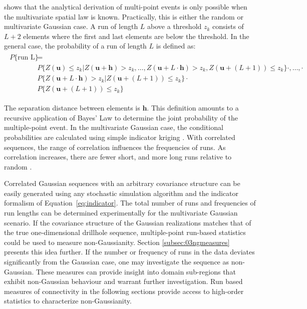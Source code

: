 \cite{ortiz2003characterization} shows that the analytical derivation of multi-point events is only possible when the multivariate spatial law is known. Practically, this is either the random or multivariate Gaussian case. A run of length $L$ above a threshold $z_{k}$ consists of $L+2$ elements where the first and last elements are below the threshold. In the general case, the probability of a run of length $L$ is defined as:
\begin{align}
    \begin{split}
        P\{\text{run L}\} & =                                                                                                                                                                \\
                          & P\{Z(\mathbf{u}) \leq z_{k}| Z(\mathbf{u + h}) > z_{k},\dots, Z(\mathbf{u} + L \cdot \mathbf{h}) > z_{k}, Z(\mathbf{u} + (L+1)) \leq z_{k}\} \cdot ,\dots, \cdot \\
                          & P\{Z(\mathbf{u} + L \cdot \mathbf{h}) > z_{k} | Z(\mathbf{u} + (L+1)) \leq z_{k}\} \cdot                                                                         \\
                          & P\{Z(\mathbf{u} + (L+1)) \leq z_{k}\}
    \end{split}
\end{align}

The separation distance between elements is $\mathbf{h}$. This definition amounts to a recursive application of Bayes' Law to determine the joint probability of the multiple-point event. In the multivariate Gaussian case, the conditional probabilities are calculated using simple indicator kriging \citep{journel1989nongaussian}. With correlated sequences, the range of correlation influences the frequencies of runs. As correlation increases, there are fewer short, and more long runs relative to random \citep{ortiz2003characterization}.

Correlated Gaussian sequences with an arbitrary covariance structure can be easily generated using any stochastic simulation algorithm and the indicator formalism of Equation~\ref{eq:indicator}. The total number of runs and frequencies of run lengths can be determined experimentally for the multivariate Gaussian scenario. If the covariance structure of the Gaussian realizations matches that of the true one-dimensional drillhole sequence, multiple-point run-based statistics could be used to measure non-Gaussianity. Section \ref{subsec:03ngmeasures} presents this idea further. If the number or frequency of runs in the data deviates significantly from the Gaussian case, one may investigate the sequence as non-Gaussian. These measures can provide insight into domain sub-regions that exhibit non-Gaussian behaviour and warrant further investigation. Run based measures of connectivity in the following sections provide access to high-order statistics to characterize non-Gaussianity.

